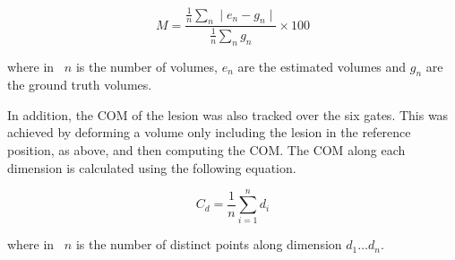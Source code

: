                 \begin{equation} \label{eq:impact_of_tof_on_respiratory_motion_model_estimation_using_pre_gated_no_intra_cycle_motion_nac_pet_methods_mape}
                   M = \frac{\frac{1}{n}\sum_{n}\mid e_n - g_n \mid}{\frac{1}{n}\sum_{n}g_n} \times 100
                \end{equation}
                
                \noindent where in~ $n$ is the number of volumes, $e_n$ are the estimated volumes and $g_n$ are the ground truth volumes.
                
                In addition, the \gls{COM} of the lesion was also tracked over the six gates. This was achieved by deforming a volume only including the lesion in the reference position, as above, and then computing the \gls{COM}. The \gls{COM} along each dimension is calculated using the following equation.
                
                \begin{equation} \label{eq:impact_of_tof_on_respiratory_motion_model_estimation_using_pre_gated_no_intra_cycle_motion_nac_pet_methods_com}
                   C_{d} = \frac{1}{n}\sum_{i = 1}^{n} d_{i}
                \end{equation}
                
                \noindent where in~ $n$ is the number of distinct points along dimension $d_1 \dotso d_n$.
            
